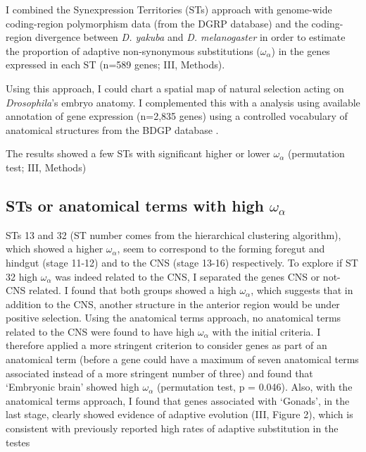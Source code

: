 
I combined the Synexpression Territories (STs) approach with genome-wide coding-region polymorphism data (from the DGRP database) and the coding-region divergence between \textit{D. yakuba} and \textit{D. melanogaster} in order to estimate the  proportion of adaptive non-synonymous substitutions ($\omega_{\alpha}$) in the genes expressed in each ST (n=589 genes; III, Methods).
	

Using this approach, I could chart a spatial map of natural selection acting on \textit{Drosophila}'s embryo anatomy.
I complemented this with a analysis using available annotation of gene expression (n=2,835 genes) using a controlled vocabulary of anatomical structures from the BDGP database \citep{Tomancak2007}.

The results showed a few STs with significant higher or lower $\omega_{\alpha}$ (permutation test; III, Methods)

\subsection{STs or anatomical terms with high $\omega_{\alpha}$}
STs 13 and 32 (ST number comes from the hierarchical clustering algorithm), which showed a higher $\omega_{\alpha}$, seem to correspond to the forming foregut and hindgut (stage 11-12) and to the CNS (stage 13-16) respectively.
To explore if ST 32 high $\omega_{\alpha}$ was indeed related to the CNS, I separated the genes CNS or not-CNS related.
I found that both groups showed a high $\omega_{\alpha}$, which suggests that in addition to the CNS, another structure in the anterior region would be under positive selection.
 Using the anatomical terms approach, no anatomical terms related to the CNS were found to have high $\omega_{\alpha}$ with the initial criteria.
I therefore applied a more stringent criterion to consider genes as part of an anatomical term (before a gene could have a maximum of seven anatomical terms associated instead of a more stringent number of three) and found that `Embryonic brain' showed high $\omega_{\alpha}$ (permutation test, p = 0.046).
Also, with the anatomical terms approach, I found that genes associated with `Gonads', in the last stage, clearly showed evidence of adaptive evolution (III, Figure 2), which is consistent with previously reported high rates of adaptive substitution in the testes \citep{Akashi1994,Civetta1995,Nuzhdin2004,Proschel2006}

